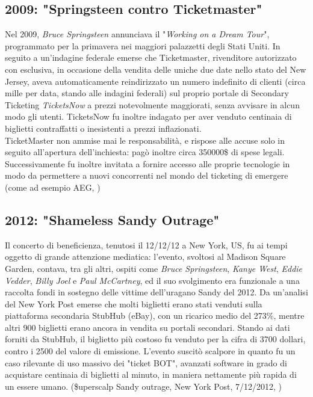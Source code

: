 \subsection{2009: "Springsteen contro Ticketmaster"}
Nel 2009, \emph{Bruce Springsteen} annunciava il "\textit{Working on a Dream Tour}", programmato per la primavera nei maggiori palazzetti degli Stati Uniti. In seguito a un'indagine federale emerse che Ticketmaster, rivenditore autorizzato con esclusiva, in occasione della vendita delle uniche due date nello stato del New Jersey, aveva automaticamente reindirizzato un numero indefinito di clienti (circa mille per data, stando alle indagini federali) sul proprio portale di Secondary Ticketing \textit{TicketsNow} a prezzi notevolmente maggiorati, senza avvisare in alcun modo gli utenti. TicketsNow fu inoltre indagato per aver venduto centinaia di biglietti contraffatti o inesistenti a prezzi inflazionati. \\
TicketMaster non ammise mai le responsabilità, e rispose alle accuse solo in seguito all'apertura dell'inchiesta: pagò inoltre circa 350000\$ di spese legali. Successivamente fu inoltre invitata a fornire accesso alle proprie tecnologie in modo da permettere a nuovi concorrenti nel mondo del ticketing di emergere (come ad esempio AEG, \cite{fortunato2011dancing})

\subsection{2012: "Shameless Sandy Outrage"}
Il concerto di beneficienza, tenutosi il 12/12/12 a New York, US, fu ai tempi oggetto di grande attenzione mediatica: l'evento, svoltosi al Madison Square Garden, contava, tra gli altri, ospiti come \textit{Bruce Springsteen}, \textit{Kanye West}, \textit{Eddie Vedder}, \textit{Billy Joel} e \textit{Paul McCartney}, ed il suo svolgimento era funzionale a una raccolta fondi in sostegno delle vittime dell'uragano Sandy del 2012.
Da un'analisi del New York Post emerse che molti biglietti erano stati venduti sulla piattaforma secondaria StubHub (eBay), con un ricarico medio del 273\%, mentre altri 900 biglietti erano ancora in vendita su portali secondari. Stando ai dati forniti da StubHub, il biglietto più costoso fu venduto per la cifra di 3700 dollari, contro i 2500 del valore di emissione. 
L'evento suscitò scalpore in quanto fu un caso rilevante di uso massivo dei "ticket BOT", avanzati software in grado di acquistare centinaia di biglietti al minuto, in maniera nettamente più rapida di un essere umano. (\$uperscalp Sandy outrage, New York Post, 7/12/2012, \cite{tompkins2018ticket})

